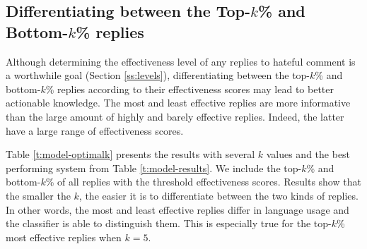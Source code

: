\documentclass[11pt]{article}
\begin{document}
\subsection{Differentiating between the Top-$k$\% and Bottom-$k$\% replies}
\label{ss:topbottom}
Although determining the effectiveness level of any replies to hateful comment is a worthwhile goal (Section \ref{ss:levels}),
differentiating between the top-$k$\% and bottom-$k$\% replies according to their effectiveness scores may lead to better actionable knowledge.
The most and least effective replies are more informative than the large amount of highly and barely effective replies.
Indeed, the latter have a large range of effectiveness scores.

Table \ref{t:model-optimalk} presents the results with several $k$ values and the best performing system from Table \ref{t:model-results}.
We include the top-$k$\% and bottom-$k$\% of all replies with the threshold effectiveness scores.
Results show that the smaller the $k$, the easier it is to differentiate between the two kinds of replies.
In other words, the most and least effective replies differ in language usage and the classifier is able to distinguish them.
This is especially true for the top-$k$\% most effective replies when $k=5$.



\end{document}
